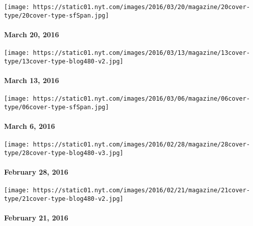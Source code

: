 \href{http://www.nytimes.com/indexes/2016/03/20/magazine/index.html}{}

\texttt{[image: https://static01.nyt.com/images/2016/03/20/magazine/20cover-type/20cover-type-sfSpan.jpg]}

\hypertarget{march-20-2016}{%
\paragraph{March 20, 2016}\label{march-20-2016}}

\href{http://www.nytimes.com/indexes/2016/03/17/magazine/index.html}{}

\texttt{[image: https://static01.nyt.com/images/2016/03/13/magazine/13cover-type/13cover-type-blog480-v2.jpg]}

\hypertarget{march-13-2016}{%
\paragraph{March 13, 2016}\label{march-13-2016}}

\href{http://www.nytimes.com/indexes/2016/03/06/magazine/index.html}{}

\texttt{[image: https://static01.nyt.com/images/2016/03/06/magazine/06cover-type/06cover-type-sfSpan.jpg]}

\hypertarget{march-6-2016}{%
\paragraph{March 6, 2016}\label{march-6-2016}}

\href{http://www.nytimes.com/indexes/2016/02/28/magazine/index.html}{}

\texttt{[image: https://static01.nyt.com/images/2016/02/28/magazine/28cover-type/28cover-type-blog480-v3.jpg]}

\hypertarget{february-28-2016}{%
\paragraph{February 28, 2016}\label{february-28-2016}}

\href{http://www.nytimes.com/indexes/2016/02/22/magazine/index.html}{}

\texttt{[image: https://static01.nyt.com/images/2016/02/21/magazine/21cover-type/21cover-type-blog480-v2.jpg]}

\hypertarget{february-21-2016}{%
\paragraph{February 21, 2016}\label{february-21-2016}}

